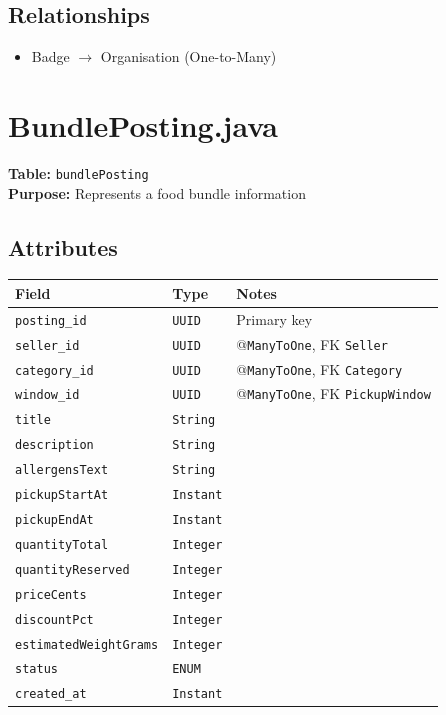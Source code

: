 \documentclass[a4paper,11pt]{article}
\begin{document}
\subsection*{Relationships}
\begin{itemize}
  \item Badge $\rightarrow$ Organisation (One-to-Many)
\end{itemize}

\section{BundlePosting.java}

\textbf{Table:} \texttt{bundlePosting} \\
\textbf{Purpose:} Represents a food bundle information 

\subsection*{Attributes}
\begin{longtable}{|p{4cm}|p{3cm}|p{6cm}|}
\hline
\textbf{Field} & \textbf{Type} & \textbf{Notes} \\
\hline
\texttt{posting\_id} & \texttt{UUID} & Primary key \\
\texttt{seller\_id} & \texttt{UUID} & @\texttt{ManyToOne}, FK \texttt{Seller} \\
\texttt{category\_id} & \texttt{UUID} & @\texttt{ManyToOne}, FK \texttt{Category} \\
\texttt{window\_id} & \texttt{UUID} & @\texttt{ManyToOne}, FK \texttt{PickupWindow} \\

\texttt{title} & \texttt{String} &  \\
\texttt{description} & \texttt{String} &  \\
\texttt{allergensText} & \texttt{String} &  \\
\texttt{pickupStartAt} & \texttt{Instant} &  \\
\texttt{pickupEndAt} & \texttt{Instant} &  \\
\texttt{quantityTotal} & \texttt{Integer} &  \\
\texttt{quantityReserved} & \texttt{Integer} &  \\
\texttt{priceCents} & \texttt{Integer} &  \\
\texttt{discountPct} & \texttt{Integer} &  \\
\texttt{estimatedWeightGrams} & \texttt{Integer} &  \\
\texttt{status} & \texttt{ENUM} &  \\
\texttt{created\_at} & \texttt{Instant} &  \\
\hline
\end{longtable}
\end{document}
